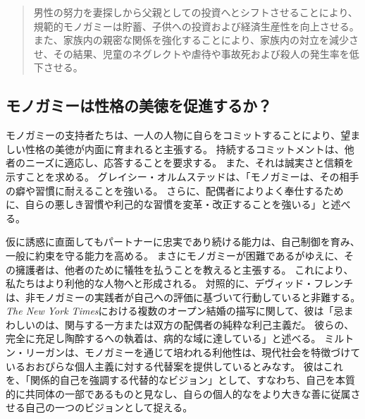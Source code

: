 \documentclass[paper=a4,book,openany]{jlreq}
\begin{document}
\begin{quote}
男性の努力を妻探しから父親としての投資へとシフトさせることにより、規範的モノガミーは貯蓄、子供への投資および経済生産性を向上させる。
また、家族内の親密な関係を強化することにより、家族内の対立を減少させ、その結果、児童のネグレクトや虐待や事故死および殺人の発生率を低下させる。
\citep[p.657]{henrich12:_puzzl_monog_marriag}
\end{quote}

\subsection{モノガミーは性格の美徳を促進するか？}

モノガミーの支持者たちは、一人の人物に自らをコミットすることにより、望ましい性格の美徳が内面に育まれると主張する。
持続するコミットメントは、他者のニーズに適応し、応答することを要求する。
また、それは誠実さと信頼を示すことを求める。
グレイシー・オルムステッドは、「モノガミーは、その相手の癖や習慣に耐えることを強いる。
さらに、配偶者によりよく奉仕するために、自らの悪しき習慣や利己的な習慣を変革・改正することを強いる」と述べる\citep{olmstead14:_in_defen_monog_marriag}。

仮に誘惑に直面してもパートナーに忠実であり続ける能力は、自己制御を育み、一般に約束を守る能力を高める。
まさにモノガミーが困難であるがゆえに、その擁護者は、他者のために犠牲を払うことを教えると主張する。
これにより、私たちはより利他的な人物へと形成される。
対照的に、デヴィッド・フレンチは、非モノガミーの実践者が自己への評価に基づいて行動していると非難する。
\emph{The New York Times}における複数のオープン結婚の描写に関して、彼は「忌まわしいのは、関与する一方または双方の配偶者の純粋な利己主義だ。
彼らの、完全に充足し陶酔するへの執着は、病的な域に達している」と述べる\citep{french17:_this_is_how_elite_poison_our_cultur}。
ミルトン・リーガンは、モノガミーを通じて培われる利他性は、現代社会を特徴づけているおおぴらな個人主義に対する代替案を提供しているとみなす。
彼はこれを、「関係的自己を強調する代替的なビジョン」として、すなわち、自己を本質的に共同体の一部であるものと見なし、自らの個人的なをより大きな善に従属させる自己の一つのビジョンとして捉える\citep[p.159]{regan96:_postm_famil_law}。
\end{document}

